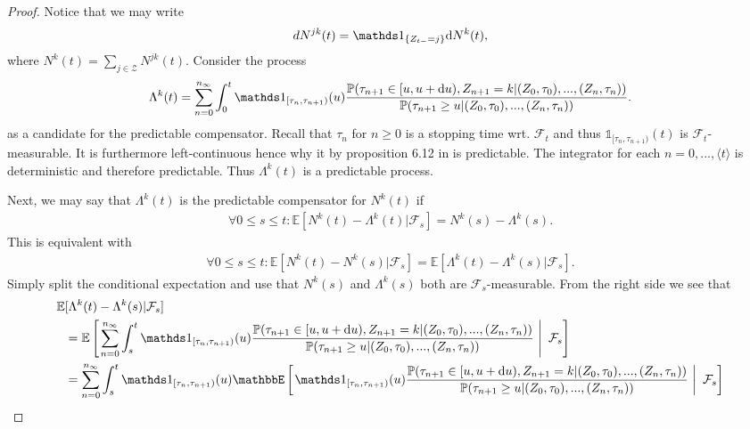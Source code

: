 \documentclass[12pt,letter,twoside]{article}
\theoremstyle{plain}
\theoremstyle{definition}
\theoremstyle{remark}
\begin{document}
\begin{proof}
Notice that we may write
\begin{align}
dN^{jk}(t)=\mathds 1_{\{ Z_{t-}=j\}}\text dN^k(t),
\end{align}
where $N^k(t)=\sum_{j\in \mathcal Z}N^{jk}(t)$. Consider the process
\begin{align}
\Lambda^{k}(t)=\sum_{n=0}^{n_\infty}\int_0^t \mathds 1_{[\tau_n,\tau_{n+1})}(u)\frac{\mathbb P(\tau_{n+1}\in [u,u+\text du), Z_{n+1}=k\vert (Z_0,\tau_0),...,(Z_n,\tau _n))}{\mathbb P(\tau_{n+1}\ge u\vert (Z_0,\tau_0),...,(Z_n,\tau _n))}.
\end{align}
as a candidate for the predictable compensator. Recall that $\tau_n$ for $n\ge 0$ is a stopping time wrt. $\mathcal F_t$ and thus $\mathds 1_{[\tau_n,\tau_{n+1})}(t)$ is $\mathcal F_t$-measurable. It is furthermore left-continuous hence why it by proposition 6.12 in \cite{lund2022} is predictable. The integrator for each $n=0,...,\langle t\rangle$ is deterministic and therefore predictable. Thus $\Lambda^k(t)$ is a predictable process.

Next, we may say that $\Lambda^k(t)$ is the predictable compensator for $N^k(t)$ if
\begin{align}
\forall 0\le s\le t : \mathbb E[N^k(t)-\Lambda^k(t)\vert \mathcal F_s]=N^k(s)-\Lambda^k(s).
\end{align}
This is equivalent with
\begin{align}
\forall 0\le s\le t : \mathbb E[N^k(t)-N^k(s)\vert \mathcal F_s]=\mathbb E[\Lambda^k(t)-\Lambda^k(s)\vert \mathcal F_s].
\end{align}
Simply split the conditional expectation and use that $N^k(s)$ and $\Lambda^k(s)$ both are $\mathcal F_s$-measurable. From the right side we see that
\begin{align*}
    \mathbb E&[\Lambda^k(t)-\Lambda^k(s)\vert \mathcal F_s]\\
&=\mathbb E\left[\left.\sum_{n=0}^{n_\infty}\int_s^t \mathds 1_{[\tau_n,\tau_{n+1})}(u)\frac{\mathbb P(\tau_{n+1}\in [u,u+\text du), Z_{n+1}=k\vert (Z_0,\tau_0),...,(Z_n,\tau _n))}{\mathbb P(\tau_{n+1}\ge u\vert (Z_0,\tau_0),...,(Z_n,\tau _n))} \ \right\vert\ \mathcal F_s\right]\\
&=\sum_{n=0}^{n_\infty}\int_s^t  \mathds 1_{[\tau_n,\tau_{n+1})}(u) \mathbbE\left[\left.\mathds 1_{[\tau_n,\tau_{n+1})}(u)\frac{\mathbb P(\tau_{n+1}\in [u,u+\text du), Z_{n+1}=k\vert (Z_0,\tau_0),...,(Z_n,\tau _n))}{\mathbb P(\tau_{n+1}\ge u\vert (Z_0,\tau_0),...,(Z_n,\tau _n))} \ \right\vert\ \mathcal F_s\right]\\
\end{align*}


\end{proof}
\end{document}
